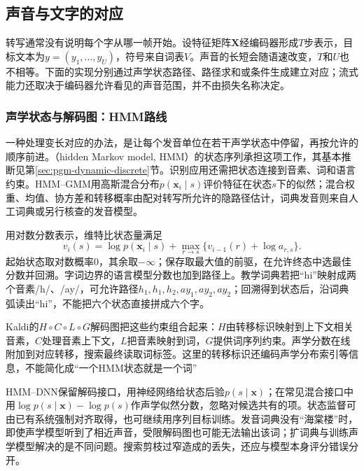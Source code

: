 \subsection{声音与文字的对应}
\label{sec:nlp-speech-correspondence}

转写通常没有说明每个字从哪一帧开始。设特征矩阵$\bm{X}$经编码器形成$T$步表示，目标文本为$y=(y_1,\ldots,y_U)$，符号来自词表$V$。声音的长短会随语速改变，$T$和$U$也不相等。下面的实现分别通过声学状态路径、路径求和或条件生成建立对应；流式能力还取决于编码器允许看见的声音范围，并不由损失名称决定。

\subsubsection{声学状态与解码图：HMM路线}
\label{sec:nlp-speech-hmm}

一种处理变长对应的办法，是让每个发音单位在若干声学状态中停留，再按允许的顺序前进。（hidden Markov model, HMM）的状态序列承担这项工作，其基本推断见第\ref{sec:pgm-dynamic-discrete}节。识别应用还需把状态连接到音素、词和语言约束。HMM--GMM用高斯混合分布$p(\bm{x}_i\mid s)$评价特征在状态$s$下的似然；混合权重、均值、协方差和转移概率由配对转写所允许的隐路径估计，词典发音则来自人工词典或另行核查的发音模型。

用对数分数表示，维特比状态量满足
\begin{equation}
 v_i(s)=\log p(\bm{x}_i\mid s)+
       \max_{r\to s}\{v_{i-1}(r)+\log a_{r,s}\}.
 \label{eq:nlp-speech-hmm-viterbi}
\end{equation}
起始状态取对数概率0，其余取$-\infty$；保存取最大值的前驱，在允许终态中选最佳分数并回溯。字词边界的语言模型分数也加到路径上。教学词典若把“hi”映射成两个音素/h/、/ay/，可允许路径$h_1,h_1,h_2,ay_1,ay_2,ay_2$；回溯得到状态后，沿词典弧读出“hi”，不能把六个状态直接拼成六个字。

Kaldi的$H\circ C\circ L\circ G$解码图把这些约束组合起来：$H$由转移标识映射到上下文相关音素，$C$处理音素上下文，$L$把音素映射到词，$G$提供词序列约束。声学分数在线附加到对应转移，搜索最终读取词标签。这里的转移标识还编码声学分布索引等信息，不能简化成“一个HMM状态就是一个词”

HMM--DNN保留解码接口，用神经网络给状态后验$p(s\mid\bm{x})$；在常见混合接口中用$\log p(s\mid\bm{x})-\log p(s)$作声学似然分数，忽略对候选共有的项。状态监督可由已有系统强制对齐取得，也可继续用序列目标训练。发音词典没有“海棠楼”时，即使声学模型听到了相近声音，受限解码图也可能无法输出该词；扩词典与训练声学模型解决的是不同问题。搜索剪枝过窄造成的丢失，还应与模型本身评分错误分开。


